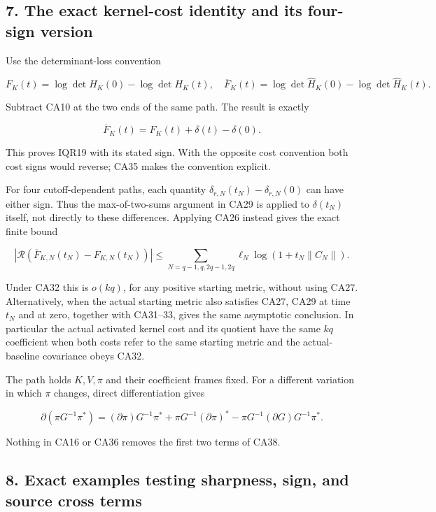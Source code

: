 \documentclass[11pt]{article}
\begin{document}
\subsection{7. The exact kernel-cost identity and its four-sign version}\label{the-exact-kernel-cost-identity-and-its-four-sign-version}

Use the determinant-loss convention

\[
F_K(t)=\log\det H_K(0)-\log\det H_K(t),
\quad
\overline F_K(t)=\log\det\widehat H_K(0)
-\log\det\widehat H_K(t).
\tag{CA35}
\]

Subtract CA10 at the two ends of the same path. The result is exactly

\[
\boxed{\overline F_K(t)=F_K(t)+\delta(t)-\delta(0).}
\tag{CA36}
\]

This proves IQR19 with its stated sign. With the opposite cost convention both cost signs would reverse; CA35 makes the convention explicit.

For four cutoff-dependent paths, each quantity \(\delta_{r,N}(t_N)-\delta_{r,N}(0)\) can have either sign. Thus the max-of-two-sums argument in CA29 is applied to \(\delta(t_N)\) itself, not directly to these differences. Applying CA26 instead gives the exact finite bound

\[
\left|\mathcal R(\overline F_{K,N}(t_N)-F_{K,N}(t_N))\right|
\le\sum_{N=q-1,q,2q-1,2q}
\ell_N\log(1+t_N\|C_N\|).
\tag{CA37}
\]

Under CA32 this is \(o(kq)\), for any positive starting metric, without using CA27. Alternatively, when the actual starting metric also satisfies CA27, CA29 at time \(t_N\) and at zero, together with CA31--33, gives the same asymptotic conclusion. In particular the actual activated kernel cost and its quotient have the same \(kq\) coefficient when both costs refer to the same starting metric and the actual-baseline covariance obeys CA32.

The path holds \(K,V,\pi\) and their coefficient frames fixed. For a different variation in which \(\pi\) changes, direct differentiation gives

\[
\partial(\pi G^{-1}\pi^*)
=(\partial\pi)G^{-1}\pi^*
+\pi G^{-1}(\partial\pi)^*
-\pi G^{-1}(\partial G)G^{-1}\pi^*.
\tag{CA38}
\]

Nothing in CA16 or CA36 removes the first two terms of CA38.

\subsection{8. Exact examples testing sharpness, sign, and source cross terms}\label{exact-examples-testing-sharpness-sign-and-source-cross-terms}
\end{document}
